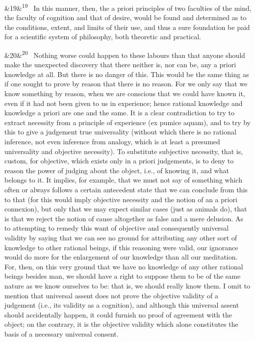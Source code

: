\documentclass[12pt]{article}
\newcommand{\para}[1][]{\par\noindent\ifx&#1&\else\textsuperscript{\footnotesize #1}~\fi}
\begin{document}
\para[19] In this manner, then, the a priori principles of two faculties of the mind, the faculty of cognition and that of desire, would be found and determined as to the conditions, extent, and limits of their use, and thus a sure foundation be paid for a scientific system of philosophy, both theoretic and practical.

\para[20] Nothing worse could happen to these labours than that anyone should make the unexpected discovery that there neither is, nor can be, any a priori knowledge at all. But there is no danger of this. This would be the same thing as if one sought to prove by reason that there is no reason. For we only say that we know something by reason, when we are conscious that we could have known it, even if it had not been given to us in experience; hence rational knowledge and knowledge a priori are one and the same. It is a clear contradiction to try to extract necessity from a principle of experience (ex pumice aquam), and to try by this to give a judgement true universality (without which there is no rational inference, not even inference from analogy, which is at least a presumed universality and objective necessity). To substitute subjective necessity, that is, custom, for objective, which exists only in a priori judgements, is to deny to reason the power of judging about the object, i.e., of knowing it, and what belongs to it. It implies, for example, that we must not say of something which often or always follows a certain antecedent state that we can conclude from this to that (for this would imply objective necessity and the notion of an a priori connexion), but only that we may expect similar cases (just as animals do), that is that we reject the notion of cause altogether as false and a mere delusion. As to attempting to remedy this want of objective and consequently universal validity by saying that we can see no ground for attributing any other sort of knowledge to other rational beings, if this reasoning were valid, our ignorance would do more for the enlargement of our knowledge than all our meditation. For, then, on this very ground that we have no knowledge of any other rational beings besides man, we should have a right to suppose them to be of the same nature as we know ourselves to be: that is, we should really know them. I omit to mention that universal assent does not prove the objective validity of a judgement (i.e., its validity as a cognition), and although this universal assent should accidentally happen, it could furnish no proof of agreement with the object; on the contrary, it is the objective validity which alone constitutes the basis of a necessary universal consent.
\end{document}
